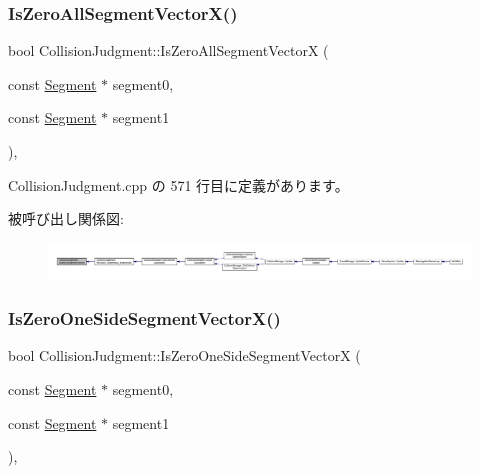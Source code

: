 \subsubsection{\texorpdfstring{Is\+Zero\+All\+Segment\+Vector\+X()}{IsZeroAllSegmentVectorX()}}
{\footnotesize\ttfamily bool Collision\+Judgment\+::\+Is\+Zero\+All\+Segment\+VectorX (\begin{DoxyParamCaption}\item[{const \mbox{\hyperlink{class_segment}{Segment}} $\ast$}]{segment0,  }\item[{const \mbox{\hyperlink{class_segment}{Segment}} $\ast$}]{segment1 }\end{DoxyParamCaption})\hspace{0.3cm}{\ttfamily [static]}, {\ttfamily [private]}}



 Collision\+Judgment.\+cpp の 571 行目に定義があります。

被呼び出し関係図\+:
\nopagebreak
\begin{figure}[H]
\begin{center}
\leavevmode
\includegraphics[width=350pt]{class_collision_judgment_adf77fae28d72345f9fda1668a1077f0d_icgraph}
\end{center}
\end{figure}
\mbox{\label{class_collision_judgment_ab2e5a2c714c8c7c7f26ef9b025b57d01}} 
\subsubsection{\texorpdfstring{Is\+Zero\+One\+Side\+Segment\+Vector\+X()}{IsZeroOneSideSegmentVectorX()}}
{\footnotesize\ttfamily bool Collision\+Judgment\+::\+Is\+Zero\+One\+Side\+Segment\+VectorX (\begin{DoxyParamCaption}\item[{const \mbox{\hyperlink{class_segment}{Segment}} $\ast$}]{segment0,  }\item[{const \mbox{\hyperlink{class_segment}{Segment}} $\ast$}]{segment1 }\end{DoxyParamCaption})\hspace{0.3cm}{\ttfamily [static]}, {\ttfamily [private]}}



